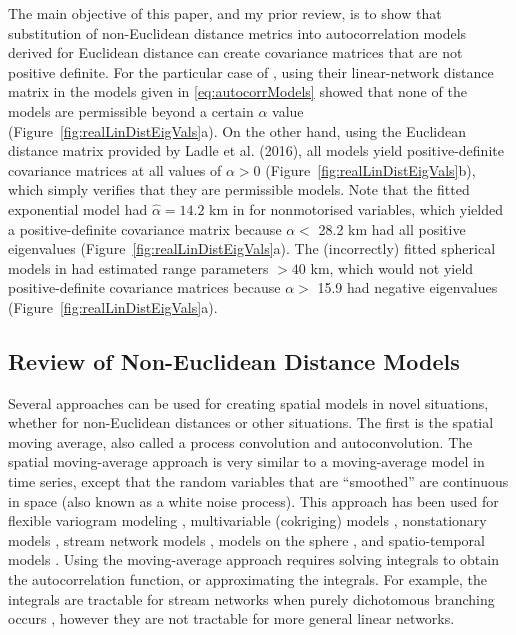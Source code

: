 \documentclass[11pt, titlepage]{article}\usepackage[]{graphicx}\usepackage[]{color}
\begin{document}
\begin{spacing}{1.9}
\begin{flushleft}
The main objective of this paper, and my prior review, is to show that substitution of non-Euclidean distance metrics into autocorrelation models derived for Euclidean distance can create covariance matrices that are not positive definite. For the particular case of \citet{Ladl:Avga:Whea:Boyc:pred:2016}, using their linear-network distance matrix in the models given in \ref{eq:autocorrModels} showed that none of the models are permissible beyond a certain $\alpha$ value (Figure~\ref{fig:realLinDistEigVals}a).  On the other hand, using the Euclidean distance matrix provided by Ladle et al. (2016), all models yield positive-definite covariance matrices at all values of $\alpha > 0$ (Figure~\ref{fig:realLinDistEigVals}b), which simply verifies that they are permissible models.  Note that the fitted exponential model had $\hat{\alpha} = 14.2$ km in \citet{Ladl:Avga:Whea:Boyc:pred:2016} for nonmotorised variables, which yielded a positive-definite covariance matrix because $\alpha <$ 28.2 km had all positive eigenvalues (Figure~\ref{fig:realLinDistEigVals}a). The (incorrectly) fitted spherical models in \citet{Ladl:Avga:Whea:Boyc:pred:2016} had estimated range parameters $>40$ km, which would not yield positive-definite covariance matrices because $\alpha >$ 15.9 had negative eigenvalues (Figure~\ref{fig:realLinDistEigVals}a).

\subsection*{Review of Non-Euclidean Distance Models}

Several approaches can be used for creating spatial models in novel situations, whether for non-Euclidean distances or other situations.  The first is the spatial moving average, also called a process convolution and autoconvolution.  The spatial moving-average approach is very similar to a moving-average model in time series, except that the random variables that are ``smoothed'' are continuous in space (also known as a white noise process).  This approach has been used for flexible variogram modeling \citep{Barr:Ver:blac:1996}, multivariable (cokriging) models \citep{Ver:Barr:cons:1998,Ver:Cres:Barr:flex:2004}, nonstationary models \citep{Higd:proc:1998,Higd:Swal:Kern:non-:1999}, stream network models \citep{Ver:Pete:Theo:spat:2006, Cres:Frey:Harc:Smit:spat:2006, Ver:Pete:Move:2010}, models on the sphere \citep{Gnei:stri:2013}, and spatio-temporal models \citep{Wikl:kern:2002,Conn:John:Ver:spat:2015}. Using the moving-average approach requires solving integrals to obtain the autocorrelation function, or approximating the integrals. For example, the integrals are tractable for stream networks when purely dichotomous branching occurs \citep{Ver:Pete:Theo:spat:2006}, however they are not tractable for more general linear networks. 


\end{flushleft}
\end{spacing}
\end{document}
